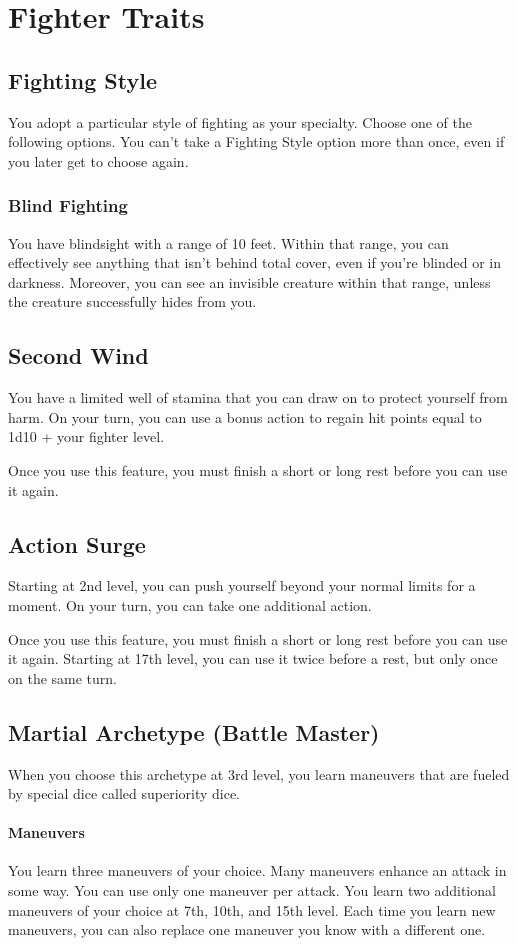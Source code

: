 {\section*{Fighter Traits}
\subsection*{Fighting Style}
You adopt a particular style of fighting as your specialty. Choose one of the following options. You can't take a Fighting Style option more than once, even if you later get to choose again.
\subsubsection*{Blind Fighting}
You have blindsight with a range of 10 feet. Within that range, you can effectively see anything that isn't behind total cover, even if you're blinded or in darkness. Moreover, you can see an invisible creature within that range, unless the creature successfully hides from you.

\subsection*{Second Wind}
You have a limited well of stamina that you can draw on to protect yourself from harm. On your turn, you can use a bonus action to regain hit points equal to 1d10 + your fighter level.

Once you use this feature, you must finish a short or long rest before you can use it again.
\subsection*{Action Surge}
Starting at 2nd level, you can push yourself beyond your normal limits for a moment. On your turn, you can take one additional action.

Once you use this feature, you must finish a short or long rest before you can use it again. Starting at 17th level, you can use it twice before a rest, but only once on the same turn.
\subsection*{Martial Archetype (Battle Master)}
When you choose this archetype at 3rd level, you learn maneuvers that are fueled by special dice called superiority dice.
\paragraph*{Maneuvers} You learn three maneuvers of your choice. Many maneuvers enhance an attack in some way. You can use only one maneuver per attack. You learn two additional maneuvers of your choice at 7th, 10th, and 15th level. Each time you learn new maneuvers, you can also replace one maneuver you know with a different one.
}
